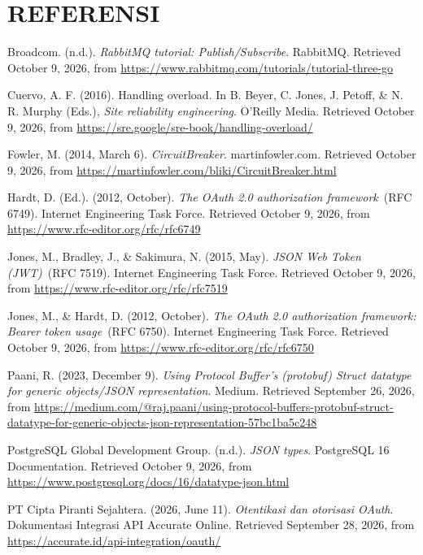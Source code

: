 \chapter*{REFERENSI}

\hangindent=1.27cm  Broadcom. (n.d.). \textit{RabbitMQ tutorial: Publish/Subscribe}. RabbitMQ. Retrieved October 9, 2026, from \url{https://www.rabbitmq.com/tutorials/tutorial-three-go}

\hangindent=1.27cm  Cuervo, A. F. (2016). Handling overload. In B. Beyer, C. Jones, J. Petoff, \& N. R. Murphy (Eds.), \textit{Site reliability engineering}. O'Reilly Media. Retrieved October 9, 2026, from \url{https://sre.google/sre-book/handling-overload/}

\hangindent=1.27cm  Fowler, M. (2014, March 6). \textit{CircuitBreaker}. martinfowler.com. Retrieved October 9, 2026, from \url{https://martinfowler.com/bliki/CircuitBreaker.html}

\hangindent=1.27cm  Hardt, D. (Ed.). (2012, October). \textit{The OAuth 2.0 authorization framework}~(RFC 6749). Internet Engineering Task Force. Retrieved October 9, 2026, from \url{https://www.rfc-editor.org/rfc/rfc6749}

\hangindent=1.27cm  Jones, M., Bradley, J., \& Sakimura, N. (2015, May). \textit{JSON Web Token (JWT)}~(RFC 7519). Internet Engineering Task Force. Retrieved October 9, 2026, from \url{https://www.rfc-editor.org/rfc/rfc7519}

\hangindent=1.27cm  Jones, M., \& Hardt, D. (2012, October). \textit{The OAuth 2.0 authorization framework: Bearer token usage}~(RFC 6750). Internet Engineering Task Force. Retrieved October 9, 2026, from \url{https://www.rfc-editor.org/rfc/rfc6750}

\hangindent=1.27cm  Paani, R. (2023, December 9). \textit{Using Protocol Buffer's (protobuf) Struct datatype for generic objects/JSON representation}. Medium. Retrieved September 26, 2026, from \url{https://medium.com/@raj.paani/using-protocol-buffers-protobuf-struct-datatype-for-generic-objects-json-representation-57bc1ba5c248}

\hangindent=1.27cm  PostgreSQL Global Development Group. (n.d.). \textit{JSON types}. PostgreSQL 16 Documentation. Retrieved October 9, 2026, from \url{https://www.postgresql.org/docs/16/datatype-json.html}

\hangindent=1.27cm  PT Cipta Piranti Sejahtera. (2026, June 11). \textit{Otentikasi dan otorisasi OAuth}. Dokumentasi Integrasi API Accurate Online. Retrieved September 28, 2026, from \url{https://accurate.id/api-integration/oauth/}

